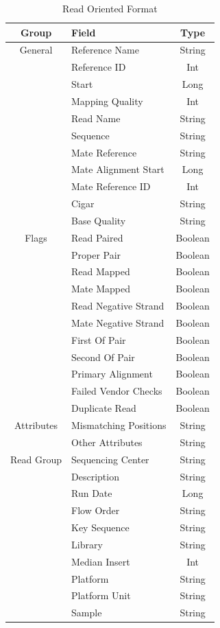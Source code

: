 \documentclass[10pt,twocolumn]{article}
\theoremstyle{plain}
\begin{document}
\begin{table}[h]
\caption{Read Oriented Format}
\label{tab:read-oriented-format}
\begin{center}
\begin{tabular}{| c | l | c |}
\hline
\bf Group & \bf Field & \bf Type \\
\hline
General & Reference Name & String \\
 & Reference ID & Int \\
 & Start & Long \\
 & Mapping Quality & Int \\
 & Read Name & String \\
 & Sequence & String \\
 & Mate Reference & String \\
 & Mate Alignment Start & Long \\
 & Mate Reference ID & Int \\
 & Cigar & String \\
 & Base Quality & String \\
\hline
Flags & Read Paired & Boolean \\
 & Proper Pair & Boolean \\
 & Read Mapped & Boolean \\
 & Mate Mapped & Boolean \\
 & Read Negative Strand & Boolean \\
 & Mate Negative Strand & Boolean \\
 & First Of Pair & Boolean \\
 & Second Of Pair & Boolean \\
 & Primary Alignment & Boolean \\
 & Failed Vendor Checks & Boolean \\
 & Duplicate Read & Boolean \\
\hline
Attributes & Mismatching Positions & String \\
 & Other Attributes & String \\
\hline
Read Group & Sequencing Center & String \\
 & Description & String \\
 & Run Date & Long \\
 & Flow Order & String \\
 & Key Sequence & String \\
 & Library & String \\
 & Median Insert & Int \\
 & Platform & String \\
 & Platform Unit & String \\
 & Sample & String \\
\hline
\end{tabular}
\end{center}
\end{table}
\end{document}
